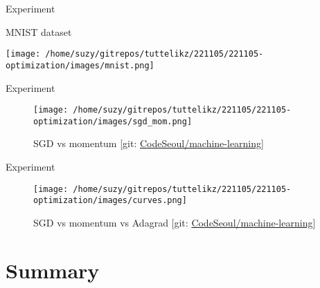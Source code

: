     \nocite{*}


    \begin{frame}{Experiment}
      \begin{flushleft}
        MNIST dataset ~\cite{lecun1998gradient}
      \end{flushleft}
      \vspace{0.1cm}
      \begin{center}
          \texttt{[image: /home/suzy/gitrepos/tuttelikz/221105/221105-optimization/images/mnist.png]}
      \end{center}
    \end{frame}

    \begin{frame}{Experiment}
      \begin{figure}[htb]
        \begin{center}
          \texttt{[image: /home/suzy/gitrepos/tuttelikz/221105/221105-optimization/images/sgd\_mom.png]}
        \end{center}
        \begin{center}
          \caption{SGD vs momentum [git: \href{https://github.com/CodeSeoul/machine-learning/tree/master/221105-optimization}{CodeSeoul/machine-learning}]}
        \end{center}
      \end{figure}
    \end{frame}

    \begin{frame}{Experiment}
      \begin{figure}[htb]
      \centering
        \texttt{[image: /home/suzy/gitrepos/tuttelikz/221105/221105-optimization/images/curves.png]}
        \caption{SGD vs momentum vs Adagrad [git: \href{https://github.com/CodeSeoul/machine-learning/tree/master/221105-optimization}{CodeSeoul/machine-learning}]}
      \end{figure}
    \end{frame}
    

    \section{Summary} %

